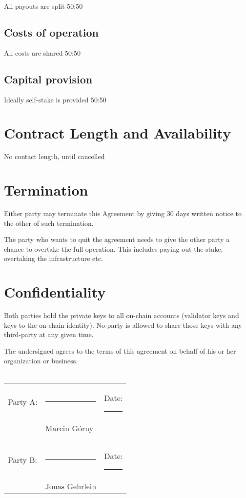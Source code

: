 \documentclass[10pt]{article}
\begin{document}
All payouts are split 50:50

\subsection{Costs of operation}

All costs are shared 50:50

\subsection{Capital provision}

Ideally self-stake is provided 50:50

\section{Contract Length and Availability}

No contact length, until cancelled

\section{Termination}

Either party may terminate this Agreement by giving 30 days written notice
to the other of such termination. 

The party who wants to quit the agreement needs to give the other party a chance to overtake the full operation. This includes paying out the stake, overtaking the infrastructure etc.

\section{Confidentiality}

Both parties hold the private keys to all on-chain accounts (validator keys and keys to the on-chain identity). No party is allowed to share those keys with any third-party at any given time.



\vspace{1cm} 

\noindent The undersigned agrees to the terms of this agreement on behalf of his or
her organization or business.\\\\

\noindent \begin{tabular}{l l l}
Party A: & \rule{6cm}{.2pt} & Date: \rule{2.4cm}{.2pt}\\
                         & Marcin Górny      & \\\\\\
Party B:          & \rule{6cm}{.2pt} & Date: \rule{2.4cm}{.2pt}\\
                         & Jonas Gehrlein      & \\
\end{tabular}
\end{document}
